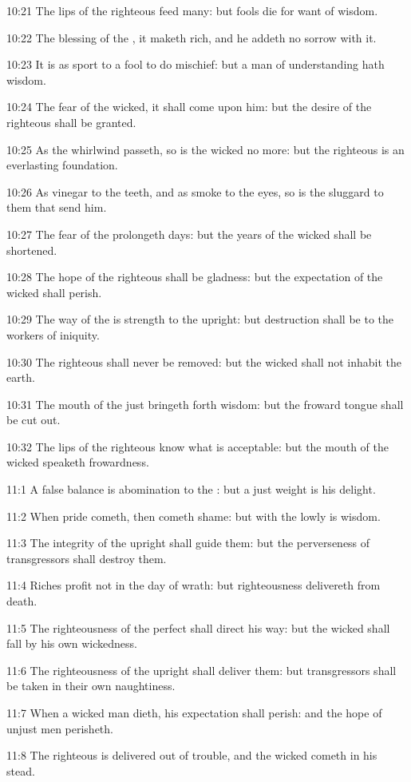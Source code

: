 10:21 The lips of the righteous feed many: but fools die for want of
wisdom.

10:22 The blessing of the \LORD, it maketh rich, and he addeth no
sorrow with it.

10:23 It is as sport to a fool to do mischief: but a man of
understanding hath wisdom.

10:24 The fear of the wicked, it shall come upon him: but the desire
of the righteous shall be granted.

10:25 As the whirlwind passeth, so is the wicked no more: but the
righteous is an everlasting foundation.

10:26 As vinegar to the teeth, and as smoke to the eyes, so is the
sluggard to them that send him.

10:27 The fear of the \LORD prolongeth days: but the years of the
wicked shall be shortened.

10:28 The hope of the righteous shall be gladness: but the expectation
of the wicked shall perish.

10:29 The way of the \LORD is strength to the upright: but destruction
shall be to the workers of iniquity.

10:30 The righteous shall never be removed: but the wicked shall not
inhabit the earth.

10:31 The mouth of the just bringeth forth wisdom: but the froward
tongue shall be cut out.

10:32 The lips of the righteous know what is acceptable: but the mouth
of the wicked speaketh frowardness.

11:1 A false balance is abomination to the \LORD: but a just weight is
his delight.

11:2 When pride cometh, then cometh shame: but with the lowly is
wisdom.

11:3 The integrity of the upright shall guide them: but the
perverseness of transgressors shall destroy them.

11:4 Riches profit not in the day of wrath: but righteousness
delivereth from death.

11:5 The righteousness of the perfect shall direct his way: but the
wicked shall fall by his own wickedness.

11:6 The righteousness of the upright shall deliver them: but
transgressors shall be taken in their own naughtiness.

11:7 When a wicked man dieth, his expectation shall perish: and the
hope of unjust men perisheth.

11:8 The righteous is delivered out of trouble, and the wicked cometh
in his stead.

